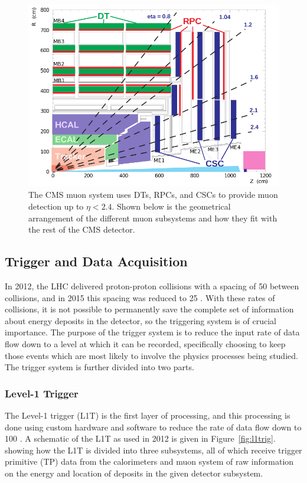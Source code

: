 \begin{figure}[htb]
\caption[The CMS Muon System]{
 The CMS muon system uses DTs, RPCs,
  and CSCs to provide muon detection
  up to $\eta < 2.4$.
 Shown below is the geometrical arrangement
  of the different muon
  subsystems and how they fit with
  the rest of the CMS detector.
 }
\label{fig:muon}
\includegraphics[width=\textwidth]{pdfs/experiment/cms_muon.png}
\end{figure}
 
\subsection{Trigger and Data Acquisition}
In 2012, the LHC delivered proton-proton collisions
 with a spacing of 50 \ns between collisions,
 and in 2015 this spacing was reduced to 25 \ns.
With these rates of collisions, 
 it is not possible to permanently save
 the complete set of information about 
 energy deposits in the detector,
 so the triggering system is of crucial importance.
The purpose of the trigger system is to reduce the 
 input rate of data flow down to a level at
 which it can be recorded, specifically choosing
 to keep those events which are most
 likely to involve the physics processes being
 studied.
The trigger system is further divided into two parts.

\subsubsection{Level-1 Trigger}
The Level-1 trigger (L1T) 
 is the first layer of processing,
 and this processing is done using custom
 hardware and software to reduce the rate 
 of data flow down to 100 \kHz.
A schematic of the L1T as used in 2012
 is given in Figure~\ref{fig:l1trig}.
 showing how the L1T is divided into three subsystems,
 all of which receive trigger primitive (TP) data
 from the calorimeters and muon system of raw information
 on the energy and location of deposits in the
 given detector subsystem.

